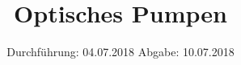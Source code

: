 

\subject{V21}
\title{Optisches Pumpen}
\date{
  Durchführung: 04.07.2018
  \hspace{3em}
  Abgabe: 10.07.2018
}



\maketitle
\thispagestyle{empty}
\tableofcontents
\newpage
\setcounter{page}{1}





\printbibliography


